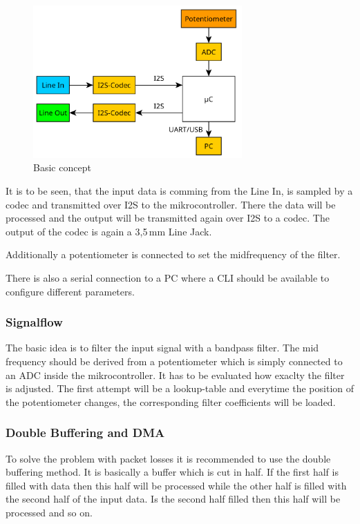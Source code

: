 \begin{figure}[!h]
    \centering
    \includegraphics[width=8cm]{img/basic_concept.PNG}
    \caption{Basic concept}
    \label{fig:basic-concept}
\end{figure}

It is to be seen, that the input data is comming from the Line In, is sampled by a codec and transmitted
over \ac{I2S} to the mikrocontroller. There the data will be processed and the output will be transmitted
again over \ac{I2S} to a codec. The output of the codec is again a 3,5\,mm Line Jack.

Additionally a potentiometer is connected to set the midfrequency of the filter.

There is also a serial connection to a PC where a \ac{CLI} should be available to configure
different parameters.

\subsubsection{Signalflow}

The basic idea is to filter the input signal with a bandpass filter. The mid frequency should be derived
from a potentiometer which is simply connected to an \ac{ADC} inside the mikrocontroller. It has to be evaluated
how exaclty the filter is adjusted. The first attempt will be a lookup-table and everytime the position of the
potentiometer changes, the corresponding filter coefficients will be loaded.

\subsubsection{Double Buffering and DMA}

To solve the problem with packet losses it is recommended to use the double buffering method.
It is basically a buffer which is cut in half. If the first half is filled with data then this half
will be processed while the other half is filled with the second half of the input data. Is the second
half filled then this half will be processed and so on.

